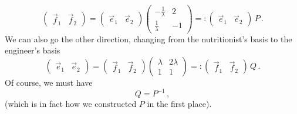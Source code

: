 {\[
\begin{pmatrix}\vec f_1 & \vec f_2\end{pmatrix}
=
\begin{pmatrix}\vec e_1 & \vec e_2\end{pmatrix}
\begin{pmatrix}-\frac1\lambda & 2\\ \frac1\lambda & -1
\end{pmatrix} =:\begin{pmatrix}\vec e_1 & \vec e_2\end{pmatrix} \, P\, .
\]
We can also go the other direction, changing from the nutritionist's basis to the  engineer's basis
\[
\begin{pmatrix}\vec e_1 & \vec e_2\end{pmatrix}
=
\begin{pmatrix}\vec f_1 & \vec f_2\end{pmatrix}
\begin{pmatrix}\lambda & 2\lambda \\ 1 & 1
\end{pmatrix} =:\begin{pmatrix}\vec f_1 & \vec f_2\end{pmatrix} \, Q\, .
\]
Of course, we must have 
\[
Q=P^{-1}\, ,
\]
(which is in fact how we constructed $P$ in the first place).

}
